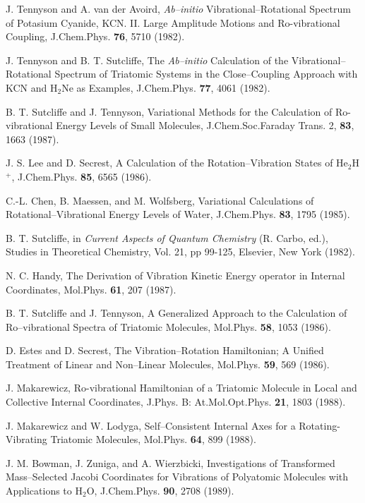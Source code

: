 \begin{thebibliography}{999}
J. Tennyson and A. van der Avoird, 
{\it Ab--initio} Vibrational--Rotational Spectrum
of Potasium Cyanide, KCN. II. Large Amplitude Motions
and Ro-vibrational Coupling,
J.Chem.Phys. 
{\bf 76}, 5710 (1982).


J. Tennyson and B. T. Sutcliffe, 
The {\it Ab--initio} Calculation of the 
Vibrational--Rotational Spectrum of Triatomic Systems in the  
Close--Coupling Approach with KCN and H$_2$Ne as Examples,
J.Chem.Phys. {\bf 77}, 4061 (1982).


B. T. Sutcliffe and J. Tennyson, 
Variational Methods for the Calculation of Ro-vibrational Energy
Levels of Small Molecules,
J.Chem.Soc.Faraday Trans. 2, 
{\bf 83}, 1663 (1987).


J. S. Lee and D. Secrest, 
A Calculation of the Rotation--Vibration States of He$_2$H$^+$,
J.Chem.Phys. {\bf 85}, 6565 (1986).

C.-L. Chen, B. Maessen, and M. Wolfsberg, 
Variational Calculations of Rotational--Vibrational Energy
Levels of Water,
J.Chem.Phys. {\bf 83}, 1795 
(1985).

B. T. Sutcliffe, in {\em Current Aspects of Quantum Chemistry}
(R. Carbo, ed.), Studies in Theoretical Chemistry, Vol. 21,
pp 99-125, Elsevier, New York (1982).

N. C. Handy, 
The Derivation of Vibration Kinetic Energy
operator in Internal Coordinates,
Mol.Phys. {\bf 61}, 207 (1987).

B. T. Sutcliffe and J. Tennyson, 
A Generalized Approach to the Calculation of Ro--vibrational Spectra
of Triatomic Molecules,
Mol.Phys. {\bf 58}, 1053 (1986).

D. Estes and D. Secrest, 
The Vibration--Rotation Hamiltonian; A Unified
Treatment of Linear and Non--Linear Molecules,
Mol.Phys. {\bf 59}, 569 (1986).

J. Makarewicz, 
Ro-vibrational Hamiltonian of a Triatomic Molecule in 
Local and Collective Internal Coordinates,
J.Phys. B: At.Mol.Opt.Phys. {\bf 21}, 1803 (1988).

J. Makarewicz and W. Lodyga, 
Self--Consistent Internal Axes for a Rotating-Vibrating
Triatomic Molecules,
Mol.Phys. {\bf 64}, 899 (1988).

J. M. Bowman, J. Zuniga, and A. Wierzbicki, 
Investigations of Transformed Mass--Selected Jacobi Coordinates
for Vibrations of Polyatomic Molecules with Applications to H$_2$O,
J.Chem.Phys. {\bf 90}, 2708 (1989).


\end{thebibliography}

